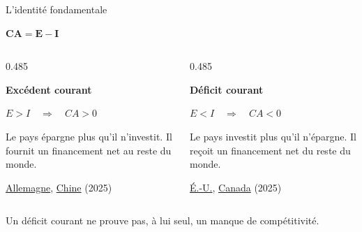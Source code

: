 \documentclass[aspectratio=169]{beamer}
\begin{document}

\begin{frame}{L'identité fondamentale}\examtag
   \centering
   {\LARGE $\boldsymbol{CA = E - I}$\par}
   \vspace{0.36cm}
   \begin{columns}[T,onlytextwidth]
      \begin{column}{0.485\textwidth}
         \begin{tcolorbox}[colback=HECgreen!7, colframe=HECgreen!7, boxrule=0pt, arc=7pt, boxsep=0pt, left=9pt, right=9pt, before skip=0pt, after skip=0pt, top=9pt, bottom=9pt, height=3.85cm, valign=top]
            \RaggedRight\small
            \textbf{Excédent courant}\par\vspace{5pt}
            {\large $E > I \quad \Longrightarrow \quad CA > 0$\par}
            \vspace{6pt}
            Le pays épargne plus qu'il n'investit. Il fournit un financement net au reste du monde.\par\vspace{6pt}
            {\footnotesize\color{HECnavy!70}\href{https://www.bundesbank.de/en/press/press-releases/german-balance-of-payments-in-december-2025-945046}{Allemagne}, \href{https://www.safe.gov.cn/en/2026/0327/2406.html}{Chine} (2025)\par}
         \end{tcolorbox}
      \end{column}
      \begin{column}{0.485\textwidth}
         \begin{tcolorbox}[colback=HECcoral!6, colframe=HECcoral!6, boxrule=0pt, arc=7pt, boxsep=0pt, left=9pt, right=9pt, before skip=0pt, after skip=0pt, top=9pt, bottom=9pt, height=3.85cm, valign=top]
            \RaggedRight\small
            \textbf{Déficit courant}\par\vspace{5pt}
            {\large $E < I \quad \Longrightarrow \quad CA < 0$\par}
            \vspace{6pt}
            Le pays investit plus qu'il n'épargne. Il reçoit un financement net du reste du monde.\par\vspace{6pt}
            {\footnotesize\color{HECnavy!70}\href{https://www.bea.gov/news/2026/us-international-transactions-and-investment-position-4th-quarter-and-year-2025}{É.-U.}, \href{https://www150.statcan.gc.ca/n1/daily-quotidien/260226/dq260226a-eng.htm}{Canada} (2025)\par}
         \end{tcolorbox}
      \end{column}
   \end{columns}
   \vspace{0.3cm}
   {\small Un déficit courant ne prouve pas, à lui seul, un manque de compétitivité.\par}
\end{frame}
\end{document}
